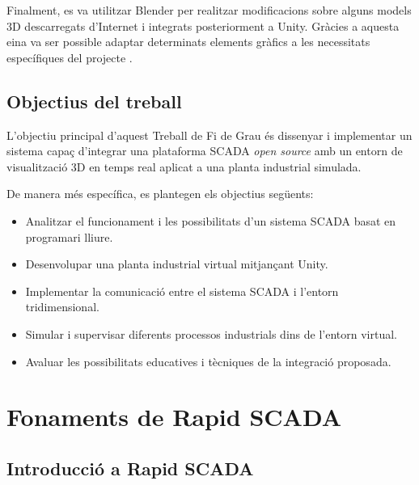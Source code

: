 \documentclass[a4paper,11pt,DIV=13,headings=normal,abstract=true,twoside=semi]{article}
\begin{document}
Finalment, es va utilitzar Blender per realitzar modificacions sobre alguns models 3D descarregats d'Internet i integrats posteriorment a Unity. Gràcies a aquesta eina va ser possible adaptar determinats elements gràfics a les necessitats específiques del projecte \cite{blender_download}.



\subsection{Objectius del treball}

L'objectiu principal d'aquest Treball de Fi de Grau és dissenyar i implementar un sistema capaç d'integrar una plataforma SCADA \textit{open source} amb un entorn de visualització 3D en temps real aplicat a una planta industrial simulada.

De manera més específica, es plantegen els objectius següents:

\begin{itemize}
    \item Analitzar el funcionament i les possibilitats d'un sistema SCADA basat en programari lliure.
    
    \item Desenvolupar una planta industrial virtual mitjançant Unity.
    
    \item Implementar la comunicació entre el sistema SCADA i l'entorn tridimensional.
    
    \item Simular i supervisar diferents processos industrials dins de l'entorn virtual.
    
    \item Avaluar les possibilitats educatives i tècniques de la integració proposada.
\end{itemize}

\newpage

\section{Fonaments de Rapid SCADA}

\subsection{Introducció a Rapid SCADA}

\end{document}

